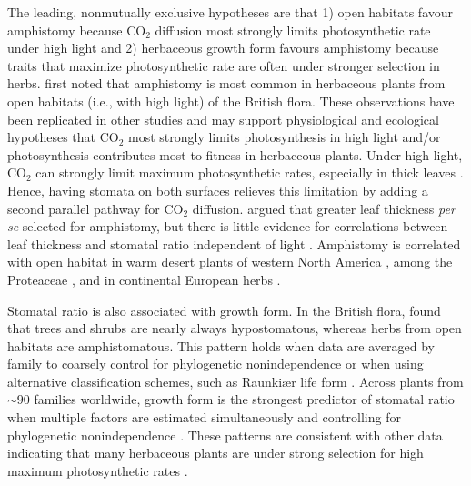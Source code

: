 \documentclass[12pt, oneside]{article}
\begin{document}
The leading, nonmutually exclusive hypotheses are that 1) open habitats favour amphistomy because CO$_2$ diffusion most strongly limits photosynthetic rate under high light and 2) herbaceous growth form favours amphistomy because traits that maximize photosynthetic rate are often under stronger selection in herbs. \cite{Salisbury_1927} first noted that amphistomy is most common in herbaceous plants from open habitats (i.e., with high light) of the British flora. These observations have been replicated in other studies \citep{Mott_etal_1982, Peat_Fitter_1994b, Jordan_etal_2014, Muir_2015} and may support physiological and ecological hypotheses that CO$_2$ most strongly limits photosynthesis in high light and/or photosynthesis contributes most to fitness in herbaceous plants. Under high light, CO$_2$ can strongly limit maximum photosynthetic rates, especially in thick leaves \citep{Jones_1985}. Hence, having stomata on both surfaces relieves this limitation by adding a second parallel pathway for CO$_2$ diffusion. \cite{Parkhurst_1978} argued that greater leaf thickness \textit{per se} selected for amphistomy, but there is little evidence for correlations between leaf thickness and stomatal ratio independent of light \citep{Mott_etal_1982, Gibson_1996, Muir_2015}. Amphistomy is correlated with open habitat in warm desert plants of western North America \citep{Mott_etal_1982, Gibson_1996}, among the Proteaceae \citep{Jordan_etal_2014}, and in continental European herbs \citep{Bucher_etal_2017}.

Stomatal ratio is also associated with growth form. In the British flora, \cite{Salisbury_1927} found that trees and shrubs are nearly always hypostomatous, whereas herbs from open habitats are amphistomatous. This pattern holds when data are averaged by family to coarsely control for phylogenetic nonindependence \citep{Peat_Fitter_1994b} or when using alternative classification schemes, such as Raunki\ae r life form \citep{Peat_Fitter_1994b}. Across plants from $\sim 90$ families worldwide, growth form is the strongest predictor of stomatal ratio when multiple factors are estimated simultaneously and controlling for phylogenetic nonindependence \citep{Muir_2015}. These patterns are consistent with other data indicating that many herbaceous plants are under strong selection for high maximum photosynthetic rates \citep{Bazzaz_1979, Korner_etal_1989, Wullschleger_1993}.
\end{document}
